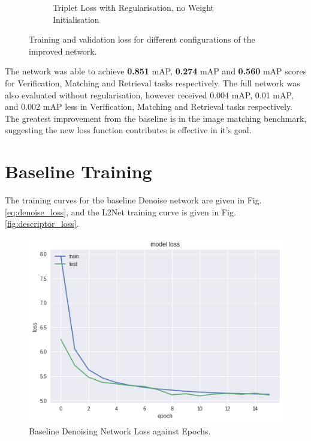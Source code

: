 \documentclass[10pt,twocolumn,letterpaper]{article}
\begin{document}
\begin{figure}[H]
\begin{subfigure}[b]{0.35\textwidth}
         \caption{Triplet Loss with Regularisation, no Weight Initialisation}
         \label{fig:triplet_loss_regularised}
     \end{subfigure}
        \caption{Training and validation loss for different configurations of the improved network.}
        \label{fig:training_val_loss_improved}
\end{figure}

The network was able to achieve \textbf{0.851} mAP, \textbf{0.274} mAP and \textbf{0.560} mAP scores for Verification, Matching and Retrieval tasks respectively. The full network was also evaluated without regularisation, however received 0.004 mAP, 0.01 mAP, and 0.002 mAP less in Verification, Matching and Retrieval tasks respectively. 
The greatest improvement from the baseline is in the image matching benchmark, suggesting the new loss function contributes is effective in it's goal.


 
{\small


}

\appendix

\section{Baseline Training}
The training curves for the baseline Denoise network are given in Fig. \ref{eq:denoise_loss}, and the L2Net training curve is given in Fig. \ref{fig:descriptor_loss}.

\begin{figure}[H]
\centering
  \includegraphics[width=0.65\linewidth]{figures/denoise_train.png}
  \caption{Baseline Denoising Network Loss against Epochs.}
  \label{fig:denoise_loss}
\end{figure}
\end{document}
